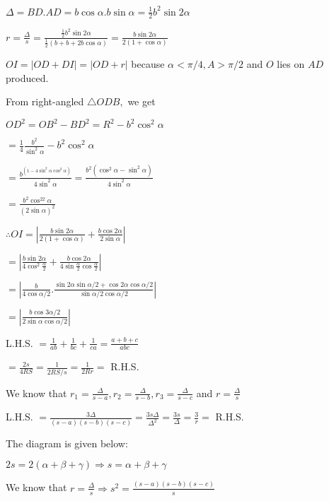   $\Delta = BD.AD = b\cos\alpha.b\sin\alpha = \frac{1}{2}b^2\sin2\alpha$

  $r = \frac{\Delta}{s} = \frac{\frac{1}{2}b^2\sin2\alpha}{\frac{1}{2}(b + b + 2b\cos\alpha)} = \frac{b\sin2\alpha}{2(1 + \cos\alpha)}$

\item $OI = |OD + DI| = |OD + r|$ because $\alpha < \pi/4, A>\pi/2$ and $O$ lies on $AD$ produced.

  From right-angled $\triangle ODB,$ we get

  $OD^2 = OB^2 - BD^2 = R^2 - b^2\cos^2\alpha$

  $= \frac{1}{4}\frac{b^2}{\sin^2\alpha} - b^2\cos^2\alpha$

  $= \frac{b^(1 - 4\sin^2\alpha\cos^2\alpha)}{4\sin^2\alpha} = \frac{b^2(\cos^2\alpha - \sin^2\alpha)}{4\sin^2\alpha}$

  $= \frac{b^2\cos^22\alpha}{(2\sin\alpha)^2}$

  $\therefore OI = \left|\frac{b\sin2\alpha}{2(1 + \cos\alpha)} + \frac{b\cos2\alpha}{2\sin\alpha}\right|$

  $= \left|\frac{b\sin2\alpha}{4\cos^2\frac{\alpha}{2}} + \frac{b\cos2\alpha}{4\sin\frac{\alpha}{2}\cos\frac{\alpha}{2}}\right|$

  $= \left|\frac{b}{4\cos\alpha/2}.\frac{\sin2\alpha\sin\alpha/2 + \cos2\alpha\cos\alpha/2}{\sin\alpha/2\cos\alpha/2}\right|$

  $= \left|\frac{b\cos3\alpha/2}{2\sin\alpha\cos\alpha/2}\right|$

\item L.H.S. $= \frac{1}{ab} + \frac{1}{bc} + \frac{1}{ca} = \frac{a + b + c}{abc}$

  $= \frac{2s}{4RS} = \frac{1}{2RS/s} = \frac{1}{2Rr} =$ R.H.S.

\item We know that $r_1 = \frac{\Delta}{s - a}, r_2 = \frac{\Delta}{s - b}, r_3 = \frac{\Delta}{s - c}$ and $r = \frac{\Delta}{s}$

  L.H.S. $= \frac{3\Delta}{(s - a)(s - b)(s - c)} = \frac{3s\Delta}{\Delta^2} = \frac{3s}{\Delta} = \frac{3}{r} =$ R.H.S.

\item The diagram is given below:

  \startplacefigure
    \externalfigure[21_10.pdf]
  \stopplacefigure

  $2s = 2(\alpha + \beta + \gamma) \Rightarrow s = \alpha + \beta + \gamma$

  We know that $r = \frac{\Delta}{s} \Rightarrow s^2 = \frac{(s - a)(s - b)(s - c)}{s}$

